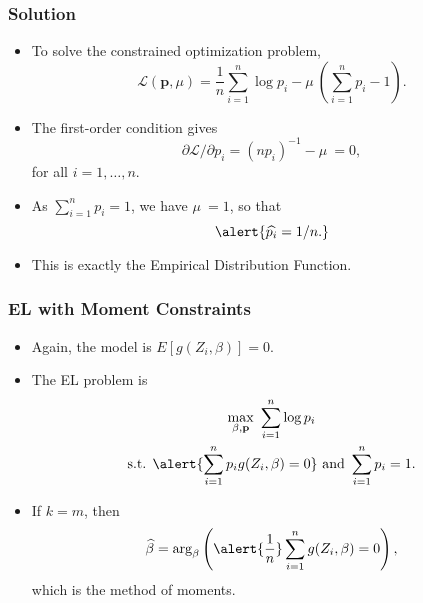 \documentclass{beamer}
\begin{document}
\begin{frame}
\frametitle{Solution}
\begin{itemize}
\item To solve the constrained optimization problem,
\begin{displaymath}
\mathcal{L}(\mathbf{p},\mu)=\frac{1}{n} \sum_{i=1}^n \log p_i - \mu\ 
\left( \sum_{i=1}^n p_i - 1 \right).
\end{displaymath}\pause

\item The first-order condition gives
\begin{displaymath}
\partial\mathcal{L}/\partial p_i = (np_i)^{-1} - \mu\ = 0, 
\end{displaymath}
for all \(i=1,\ldots,n\). \pause

\item As $\sum_{i=1}^n p_i = 1$, we have $\mu\ = 1$, so that 
\[ \alert{\widehat{p_i} = 1/n.}\]

\item This is exactly the Empirical Distribution Function.
\end{itemize}
\end{frame}





\begin{frame}
\frametitle{EL with Moment Constraints}
\begin{itemize}
\item Again, the model is 
\(E[g(Z_i, \beta)]=0.\) \pause

\item 
The EL problem is 
\begin{gather*}
\max_{\beta, \mathbf{p}} \ \sum_{i=1}^n \log p_i \\ 
 \mbox{s.t. }  \alert{\sum_{i=1}^n p_i g(Z_i,\beta) =0} 
\mbox{ and } 
\sum_{i=1}^n
p_i = 1.
\end{gather*}\pause

\item If \(k = m\), then
\[
\widehat{\beta} = \arg_{\beta} \left(
\alert{\frac{1}{n}} \sum_{i=1}^n g(Z_i,\beta)=0
\right),
\]
which is the method of moments.
\end{itemize}

\end{frame}
\end{document}

